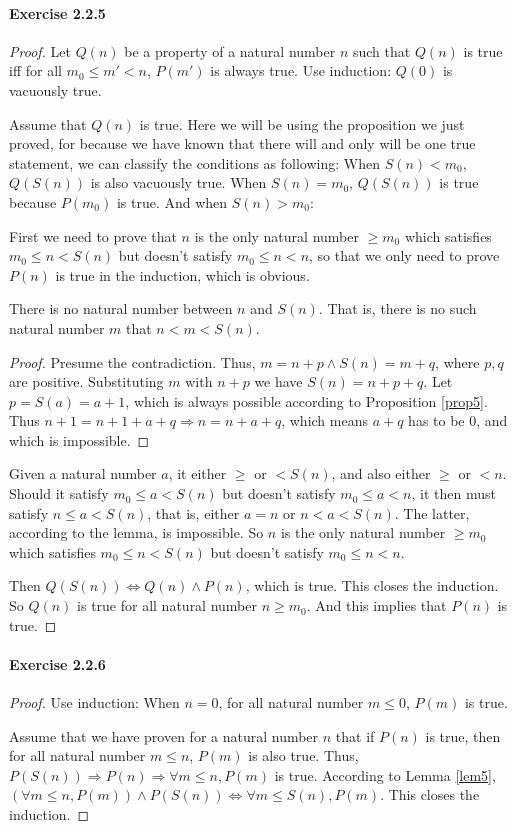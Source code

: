 \paragraph{Exercise 2.2.5} \label{exercise2.2.5}
\begin{proof}
Let $Q(n)$ be a property of a natural number $n$ such that $Q(n)$ is true iff for all $m_0\leq m'<n$, 
$P(m')$ is always true. Use induction: $Q(0)$ is vacuously true.

Assume that $Q(n)$ is true. Here we will be using the proposition we just proved, for because we have 
known that there will and only will be one true statement, we can classify the conditions as 
following: When $S(n)<m_0$, $Q(S(n))$ is also vacuously true. When $S(n)=m_0$, $Q(S(n))$ is true 
because $P(m_0)$ is true. And when $S(n)>m_0$:

First we need to prove that $n$ is the only natural number $\geq m_0$ which satisfies $m_0 \leq n<S(n)$ 
but doesn't satisfy $m_0 \leq n<n$, so that we only need to prove $P(n)$ is true in the induction, 
which is obvious.
\begin{lem}
There is no natural number between $n$ and $S(n)$. That is, there is no such natural number $m$ that 
$n<m<S(n)$. \label{lem5}
\end{lem}
\begin{proof}
Presume the contradiction. Thus, $m=n+p \wedge S(n)=m+q$, where $p,q$ are positive. Substituting $m$ 
with $n+p$ we have $S(n)=n+p+q$. Let $p=S(a)=a+1$, which is always possible according to Proposition 
\ref{prop5}. Thus $n+1=n+1+a+q \Rightarrow n=n+a+q$, which means $a+q$ has to be 0, and which is 
impossible.
\end{proof}

Given a natural number $a$, it either $\geq$ or $<S(n)$, and also either $\geq$ or $<n$. Should it 
satisfy $m_0 \leq a<S(n)$ but doesn't satisfy $m_0 \leq a<n$, it then must satisfy $n \leq a<S(n)$, 
that is, either $a=n$ or $n<a<S(n)$. The latter, according to the lemma, is impossible. So $n$ is the 
only natural number $\geq m_0$ which satisfies $m_0 \leq n<S(n)$ but doesn't satisfy $m_0 \leq n<n$.

Then $Q(S(n)) \Leftrightarrow Q(n) \wedge P(n)$, which is true. This closes the induction. So $Q(n)$ is 
true for all natural number $n \geq m_0$. And this implies that $P(n)$ is true.
\end{proof}

\paragraph{Exercise 2.2.6} \label{exercise2.2.6}
\begin{proof}
Use induction: When $n=0$, for all natural number $m\leq 0$, $P(m)$ is true.

Assume that we have proven for a natural number $n$ that if $P(n)$ is true, then for all natural number 
$m\leq n$, $P(m)$ is also true. Thus, $P(S(n)) \Rightarrow P(n) \Rightarrow \forall m\leq n, P(m)$
is true. According to Lemma \ref{lem5}, 
$(\forall m\leq n, P(m)) \wedge P(S(n)) \Leftrightarrow \forall m \leq S(n), P(m)$. This closes the 
induction.
\end{proof}


